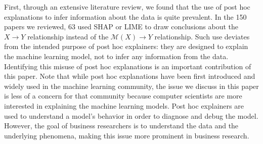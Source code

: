 \documentclass[mnsc,blindrev]{informs3}
\begin{document}
        First, through an extensive literature review, we found that the use of post hoc explanations to infer information about the data is quite prevalent. In the 150 papers we reviewed, 63 used SHAP or LIME to draw conclusions about the $X\rightarrow Y$ relationship instead of the $\mathcal{M}(X)\rightarrow Y$ relationship. Such use deviates from the intended purpose of post hoc explainers: they are designed to explain the machine learning model, not to infer any information from the data. Identifying this misuse of post hoc explanations is an important contribution of this paper. Note that while post hoc explanations have been first introduced and widely used in the machine learning community, the issue we discuss in this paper is less of a concern for that community because computer scientists are more interested in explaining the machine learning models. Post hoc explainers are used to understand a model's behavior in order to diagnose and debug the model. However, the goal of business researchers is to understand the data and the underlying phenomena, making this issue more prominent in business research.

\end{document}
